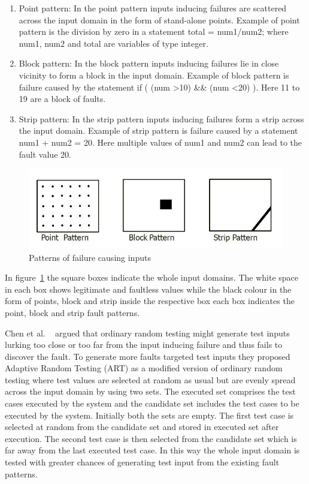 \begin{enumerate}
\item Point pattern: In the point pattern inputs inducing failures are scattered across the input domain in the form of stand-alone points. Example of point pattern is the division by zero in a statement total = num1/num2; where num1, num2 and total are variables of type integer.
\item Block pattern: In the block pattern inputs inducing failures lie in close vicinity to form a block in the input domain. Example of block pattern is failure caused by the statement if ( (num \textgreater 10) \&\& (num \textless 20) ). Here 11 to 19 are a block of faults.
\item Strip pattern: In the strip pattern inputs inducing failures form a strip across the input domain. Example of strip pattern is failure caused by a statement num1 + num2 = 20. Here multiple values of num1 and num2 can lead to the fault value 20. 
\end{enumerate}

\begin{figure}[h]
	\centering
	\includegraphics[scale=0.5]{chapter2/pointblockstrip.jpg}
	\caption{Patterns of failure causing inputs}
	\label{fig:patterns2}
\end{figure}

In figure~\ref{fig:patterns2} the square boxes indicate the whole input domains. The white space in each box shows legitimate and faultless values while the black colour in the form of points, block and strip inside the respective box each box indicates the point, block and strip fault patterns.

Chen et al. ~\cite{Chen2008} argued that ordinary random testing might generate test inputs lurking too close or too far from the input inducing failure and thus fails to discover the fault. To generate more faults targeted test inputs they proposed Adaptive Random Testing (ART) as a modified version of ordinary random testing where test values are selected at random as usual but are evenly spread across the input domain by using two sets. The executed set comprises the test cases executed by the system and the candidate set includes the test cases to be executed by the system. Initially both the sets are empty. The first test case is selected at random from the candidate set and stored in executed set after execution. The second test case is then selected from the candidate set which is far away from the last executed test case. In this way the whole input domain is tested with greater chances of generating test input from the existing fault patterns.

